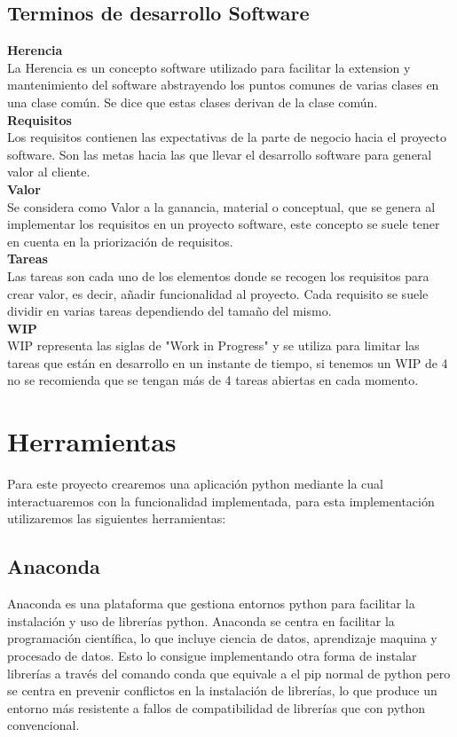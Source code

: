 \documentclass[12pt,a4paper]{article}
\begin{document}
\subsection{Terminos de desarrollo Software}
{\textbf{Herencia}}\\
	La Herencia es un concepto software utilizado para facilitar la extension y mantenimiento del software abstrayendo los puntos comunes de varias clases en una clase común. Se dice que estas clases derivan de la clase común.\\
{\textbf{Requisitos}}\\
	Los requisitos contienen las expectativas de la parte de negocio hacia el proyecto software. Son las metas hacia las que llevar el desarrollo software para general valor al cliente.\\
{\textbf{Valor}}\\
	Se considera como Valor a la ganancia, material o conceptual, que se genera al implementar los requisitos en un proyecto software, este concepto se suele tener en cuenta en la priorización de requisitos.\\
{\textbf{Tareas}}\\
	Las tareas son cada uno de los elementos donde se recogen los requisitos para crear valor, es decir, añadir funcionalidad al proyecto. Cada requisito se suele dividir en varias tareas dependiendo del tamaño del mismo.\\
{\textbf{WIP}}\\
	WIP representa las siglas de "Work in Progress" y se utiliza para limitar las tareas que están en desarrollo en un instante de tiempo, si tenemos un WIP de 4 no se recomienda que se tengan más de 4 tareas abiertas en cada momento.\\
	
\pagebreak
	\vspace{1cm}






	\vspace{1cm}
	\section{Herramientas}
	\vspace{1cm}
Para este proyecto crearemos una aplicación python mediante la cual interactuaremos con la funcionalidad implementada, para esta implementación utilizaremos las siguientes herramientas:\\
\subsection{Anaconda}
Anaconda es una plataforma que gestiona entornos python para facilitar la instalación y uso de librerías python. Anaconda se centra en facilitar la programación científica, lo que incluye ciencia de datos, aprendizaje maquina y procesado de datos. Esto lo consigue implementando otra forma de instalar librerías a través del comando conda que equivale a el pip normal de python pero se centra en prevenir conflictos en la instalación de librerías, lo que produce un entorno más resistente a fallos de compatibilidad de librerías que con python convencional.\\
\end{document}
